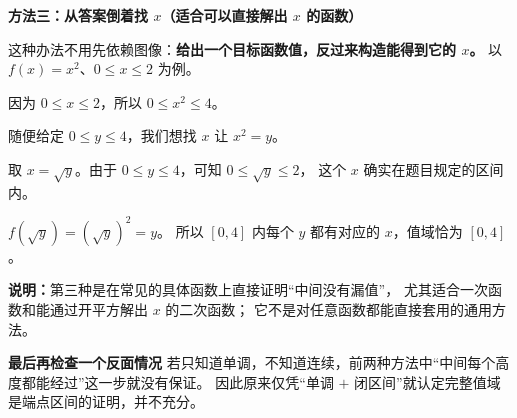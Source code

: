 \begin{proofbox}
\textbf{\textcolor{CProof}{方法三：从答案倒着找 $x$（适合可以直接解出 $x$ 的函数）}}
\begin{center}\end{center}

    这种办法不用先依赖图像：\textbf{给出一个目标函数值，反过来构造能得到它的 $x$。}
    以 $f(x)=x^2$、$0\le x\le2$ 为例。
    \begin{description}[style=nextline,leftmargin=2.8em,labelsep=0.5em,itemsep=0.48em]
        \item[\textbf{第一步：确定函数值不会超出范围。}]
            因为 $0\le x\le2$，所以 $0\le x^2\le4$。
        \item[\textbf{第二步：任取范围内的数。}]
            随便给定 $0\le y\le4$，我们想找 $x$ 让 $x^2=y$。
        \item[\textbf{第三步：直接把 $x$ 找出来。}]
            取 $x=\sqrt{y}$。由于 $0\le y\le4$，可知 $0\le\sqrt y\le2$，
            这个 $x$ 确实在题目规定的区间内。
        \item[\textbf{第四步：代回核对。}]
            $f(\sqrt y)=(\sqrt y)^2=y$。
            所以 $[0,4]$ 内每个 $y$ 都有对应的 $x$，值域恰为 $[0,4]$。
    \end{description}
    \textbf{说明：}第三种是在常见的具体函数上直接证明“中间没有漏值”，
    尤其适合一次函数和能通过开平方解出 $x$ 的二次函数；
    它不是对任意函数都能直接套用的通用方法。

    \medskip
    \textbf{\textcolor{CProof}{最后再检查一个反面情况}}
    若只知道单调，不知道连续，前两种方法中“中间每个高度都能经过”这一步就没有保证。
    因此原来仅凭“单调 $+$ 闭区间”就认定完整值域是端点区间的证明，并不充分。
\end{proofbox}

